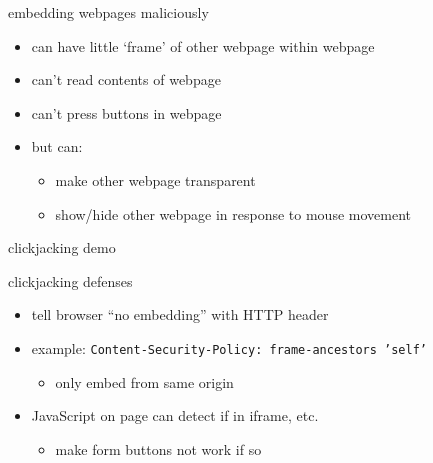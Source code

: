 
\begin{frame}{embedding webpages maliciously}
    \begin{itemize}
    \item can have little `frame' of other webpage within webpage
    \item can't read contents of webpage
    \item can't press buttons in webpage
    \vspace{.5cm}
    \item but can:
        \begin{itemize}
        \item make other webpage transparent
        \item show/hide other webpage in response to mouse movement
        \end{itemize}
    \end{itemize}
\end{frame}

\begin{frame}{clickjacking demo}
\end{frame}

\begin{frame}{clickjacking defenses}
    \begin{itemize}
    \item tell browser ``no embedding'' with HTTP header
    \item example: \texttt{\small Content-Security-Policy: frame-ancestors 'self'}
        \begin{itemize}
        \item only embed from same origin
        \end{itemize}
        \vspace{.5cm}
    \item JavaScript on page can detect if in iframe, etc.
        \begin{itemize}
        \item make form buttons not work if so
        \end{itemize}
    \end{itemize}
\end{frame}


